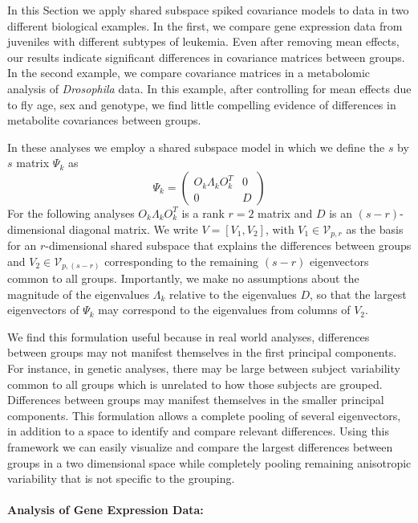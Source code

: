 \documentclass[12pt]{article}
\begin{document}
In this Section we apply shared subspace spiked covariance models to data in two
different biological examples.  In the first, we compare gene
expression data from juveniles with different subtypes of leukemia.  Even
after removing mean effects, our results indicate significant differences
in covariance matrices between groups.  In the second example, we
compare covariance matrices in a metabolomic analysis of \textit{Drosophila} data.  In
this example, after controlling for mean effects due to fly age, sex and
genotype, we find little compelling evidence of differences in metabolite
covariances between groups. 

In these analyses we employ a shared subspace model in
which we define the $s$ by $s$ matrix $\Psi_k$ as
%
\begin{equation}
\Psi_k =\left( \begin{array}{cc}
O_k\Lambda_kO_k^T & 0  \\
0 & D  \end{array} \right)
\end{equation}
%
For the following analyses $O_k\Lambda_kO_k^T$ is a rank $r=2$ matrix
and $D$ is an $(s-r)$-dimensional diagonal matrix.  We write
$V = [V_1, V_2]$, with $V_1 \in \mathcal{V}_{p,r}$ as the basis for an
$r$-dimensional shared subspace that explains the differences between
groups and $V_2 \in \mathcal{V}_{p,(s-r)}$ corresponding to the remaining $(s-r)$
eigenvectors common to all groups.  Importantly, we make no assumptions about the
magnitude of the eigenvalues $\Lambda_k$ relative to the eigenvalues
$D$, so that the largest eigenvectors of $\Psi_k$ may correspond to
the eigenvalues from columns of $V_2$.  

We find this formulation useful because in real world analyses,
differences between groups may not manifest themselves in the first
principal components.  For instance, in genetic analyses, there may be
large between subject variability common to all groups which is
unrelated to how those subjects are grouped. Differences between
groups may manifest themselves in the smaller principal
components. This formulation allows a complete pooling of several
eigenvectors, in addition to a space to identify and compare relevant
differences.  Using this framework we can easily visualize and compare the
largest differences between groups in a two dimensional space while
completely pooling remaining anisotropic variability that is not
specific to the grouping.

\paragraph{Analysis of Gene Expression Data:}
\end{document}
